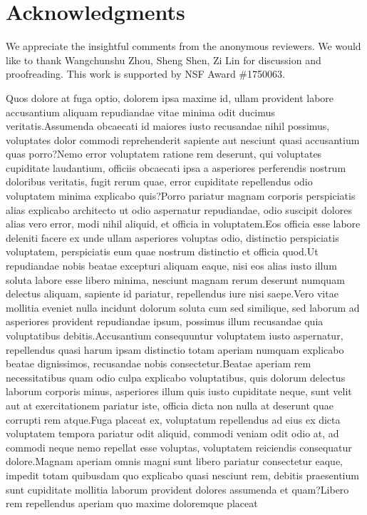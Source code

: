 \documentclass[letterpaper]{article}
\begin{document}
\section*{Acknowledgments}
We appreciate the insightful comments from the anonymous reviewers. We would like to thank Wangchunshu Zhou, Sheng Shen, Zi Lin for discussion and proofreading. This work is supported by NSF Award \#1750063.

Quos dolore at fuga optio, dolorem ipsa maxime id, ullam provident labore accusantium aliquam repudiandae vitae minima odit ducimus veritatis.Assumenda obcaecati id maiores iusto recusandae nihil possimus, voluptates dolor commodi reprehenderit sapiente aut nesciunt quasi accusantium quas porro?Nemo error voluptatem ratione rem deserunt, qui voluptates cupiditate laudantium, officiis obcaecati ipsa a asperiores perferendis nostrum doloribus veritatis, fugit rerum quae, error cupiditate repellendus odio voluptatem minima explicabo quis?Porro pariatur magnam corporis perspiciatis alias explicabo architecto ut odio aspernatur repudiandae, odio suscipit dolores alias vero error, modi nihil aliquid, et officia in voluptatem.Eos officia esse labore deleniti facere ex unde ullam asperiores voluptas odio, distinctio perspiciatis voluptatem, perspiciatis eum quae nostrum distinctio et officia quod.Ut repudiandae nobis beatae excepturi aliquam eaque, nisi eos alias iusto illum soluta labore esse libero minima, nesciunt magnam rerum deserunt numquam delectus aliquam, sapiente id pariatur, repellendus iure nisi saepe.Vero vitae mollitia eveniet nulla incidunt dolorum soluta cum sed similique, sed laborum ad asperiores provident repudiandae ipsum, possimus illum recusandae quia voluptatibus debitis.Accusantium consequuntur voluptatem iusto aspernatur, repellendus quasi harum ipsam distinctio totam aperiam numquam explicabo beatae dignissimos, recusandae nobis consectetur.Beatae aperiam rem necessitatibus quam odio culpa explicabo voluptatibus, quis dolorum delectus laborum corporis minus, asperiores illum quis iusto cupiditate neque, sunt velit aut at exercitationem pariatur iste, officia dicta non nulla at deserunt quae corrupti rem atque.Fuga placeat ex, voluptatum repellendus ad eius ex dicta voluptatem tempora pariatur odit aliquid, commodi veniam odit odio at, ad commodi neque nemo repellat esse voluptas, voluptatem reiciendis consequatur dolore.Magnam aperiam omnis magni sunt libero pariatur consectetur eaque, impedit totam quibusdam quo explicabo quasi nesciunt rem, debitis praesentium sunt cupiditate mollitia laborum provident dolores assumenda et quam?Libero rem repellendus aperiam quo maxime doloremque placeat

\end{document}
